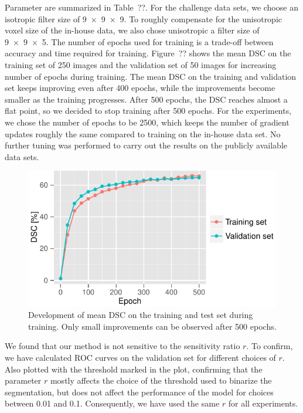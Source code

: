 Parameter are summarized in Table~??. For the challenge data sets, we choose an
isotropic filter size of \num{9x9x9}. To roughly compensate for the unisotropic
voxel size of the in-house data, we also chose unisotropic a filter size of
\num{9x9x5}. The number of epochs used for training is a trade-off between
accuracy and time required for training. Figure~?? shows the mean DSC on the
training set of 250 images and the validation set of 50 images for increasing
number of epochs during training. The mean DSC on the training and validation
set keeps improving even after 400 epochs, while the improvements become smaller
as the training progresses. After 500 epochs, the DSC reaches almost a flat
point, so we decided to stop training after 500 epochs. For the experiments, we
chose the number of epochs to be 2500, which keeps the number of gradient
updates roughly the same compared to training on the in-house data set. No
further tuning was performed to carry out the results on the publicly available
data sets.
\begin{figure}
\centering
\includegraphics[width=\columnwidth]{figures/ems_progress2}
\caption{Development of mean DSC on the training and test set during training.
Only small improvements can be observed after 500 epochs.}
\end{figure}

We found that our method is not sensitive to the sensitivity ratio $r$. To
confirm, we have calculated ROC curves on the validation set for different
choices of $r$. Also plotted with the threshold marked in the plot, confirming
that the parameter $r$ mostly affects the choice of the threshold used to
binarize the segmentation, but does not affect the performance of the model for
choices between 0.01 and 0.1. Consequently, we have used the same $r$ for all
experiments.

